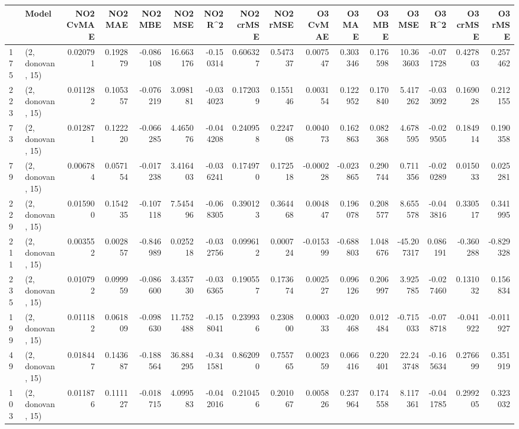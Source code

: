 \begin{tabular}{llrrrrrrrrrrrrrr}
\toprule
{} &             Model &  NO2 CvMAE &   NO2 MAE &   NO2 MBE &     NO2 MSE &   NO2 R\textasciicircum2 &  NO2 crMSE &  NO2 rMSE &  O3 CvMAE &    O3 MAE &    O3 MBE &      O3 MSE &    O3 R\textasciicircum2 &  O3 crMSE &   O3 rMSE \\
\midrule
175 &  (2, donovan, 15) &   0.020791 &  0.192879 & -0.086108 &   16.663176 & -0.150314 &   0.606327 &  0.547337 &  0.007547 &  0.303346 &  0.176598 &   10.363603 & -0.071728 &  0.427803 &  0.257462 \\
223 &  (2, donovan, 15) &   0.011282 &  0.105357 & -0.076219 &    3.098181 & -0.034023 &   0.172039 &  0.155146 &  0.003154 &  0.122952 &  0.170840 &    5.417262 & -0.033092 &  0.169028 &  0.212155 \\
73  &  (2, donovan, 15) &   0.012871 &  0.122220 & -0.066285 &    4.465076 & -0.044208 &   0.240958 &  0.224708 &  0.004073 &  0.162863 &  0.082368 &    4.678595 & -0.029505 &  0.184914 &  0.190358 \\
79  &  (2, donovan, 15) &   0.006784 &  0.057154 & -0.017238 &    3.416403 & -0.036241 &   0.174970 &  0.172518 & -0.000228 & -0.023865 &  0.290744 &    0.711356 & -0.020289 &  0.015033 &  0.025281 \\
229 &  (2, donovan, 15) &   0.015900 &  0.154235 & -0.107118 &    7.545496 & -0.068305 &   0.390123 &  0.364468 &  0.004847 &  0.196078 &  0.208577 &    8.655578 & -0.043816 &  0.330517 &  0.341995 \\
211 &  (2, donovan, 15) &   0.003552 &  0.002857 & -0.846989 &    0.025218 & -0.032756 &   0.099612 &  0.000724 & -0.015399 & -0.688803 &  1.048676 &  -45.207317 &  0.086191 & -0.360288 & -0.829328 \\
235 &  (2, donovan, 15) &   0.010792 &  0.099959 & -0.086600 &    3.435730 & -0.036365 &   0.190557 &  0.173674 &  0.002527 &  0.096126 &  0.206997 &    3.925785 & -0.027460 &  0.131032 &  0.156834 \\
199 &  (2, donovan, 15) &   0.011182 &  0.061809 & -0.098630 &   11.752488 & -0.158041 &   0.239936 &  0.230800 &  0.000333 & -0.020468 &  0.012484 &   -0.715033 & -0.078718 & -0.041922 & -0.011927 \\
49  &  (2, donovan, 15) &   0.018447 &  0.143687 & -0.188564 &   36.884295 & -0.341581 &   0.862090 &  0.755765 &  0.002359 &  0.066416 &  0.220401 &   22.243748 & -0.165634 &  0.276699 &  0.351919 \\
103 &  (2, donovan, 15) &   0.011876 &  0.111127 & -0.018715 &    4.099583 & -0.042016 &   0.210456 &  0.201067 &  0.005826 &  0.237964 &  0.174558 &    8.117361 & -0.041785 &  0.299205 &  0.323032 \\

\end{tabular}
